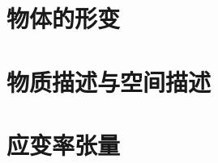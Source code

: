 \documentclass[zihao=-4,linespread=1.5,heading=true,a4paper,twoside]{ctexart}
\begin{document}
\section{物体的形变}


\section{物质描述与空间描述}


\section{应变率张量}










\end{document}
